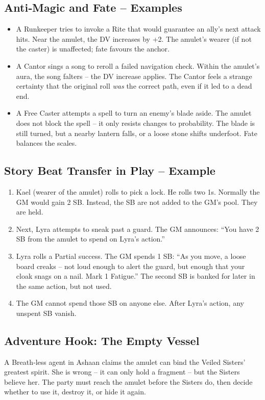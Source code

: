 \documentclass[11pt]{book}
\begin{document}
\subsection*{Anti‑Magic and Fate – Examples}
\begin{itemize}
    \item A Runkeeper tries to invoke a Rite that would guarantee an ally’s next attack hits. Near the amulet, the DV increases by +2. The amulet’s wearer (if not the caster) is unaffected; fate favours the anchor.
    \item A Cantor sings a song to reroll a failed navigation check. Within the amulet’s aura, the song falters – the DV increase applies. The Cantor feels a strange certainty that the original roll \textit{was} the correct path, even if it led to a dead end.
    \item A Free Caster attempts a spell to turn an enemy’s blade aside. The amulet does not block the spell – it only resists changes to probability. The blade is still turned, but a nearby lantern falls, or a loose stone shifts underfoot. Fate balances the scales.
\end{itemize}

\subsection*{Story Beat Transfer in Play – Example}
\begin{enumerate}
    \item Kael (wearer of the amulet) rolls to pick a lock. He rolls two 1s. Normally the GM would gain 2 SB. Instead, the SB are not added to the GM’s pool. They are held.
    \item Next, Lyra attempts to sneak past a guard. The GM announces: “You have 2 SB from the amulet to spend on Lyra’s action.”
    \item Lyra rolls a Partial success. The GM spends 1 SB: “As you move, a loose board creaks – not loud enough to alert the guard, but enough that your cloak snags on a nail. Mark 1 Fatigue.” The second SB is banked for later in the same action, but not used.
    \item The GM cannot spend those SB on anyone else. After Lyra’s action, any unspent SB vanish.
\end{enumerate}

\subsection*{Adventure Hook: The Empty Vessel}
A Breath‑less agent in Ashaan claims the amulet can bind the Veiled Sisters’ greatest spirit. She is wrong – it can only hold a fragment – but the Sisters believe her. The party must reach the amulet before the Sisters do, then decide whether to use it, destroy it, or hide it again.
\end{document}
